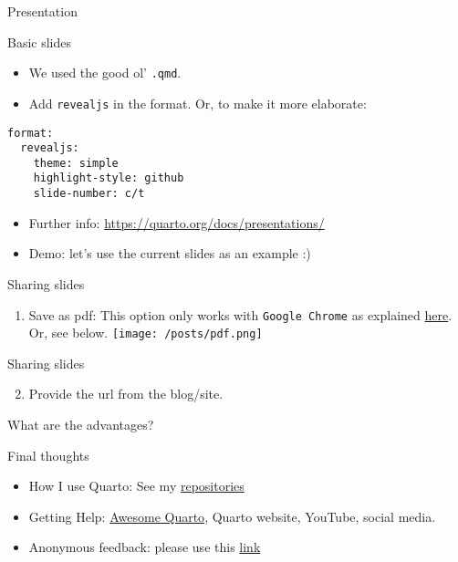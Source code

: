 \documentclass[
  ignorenonframetext,
  aspectratio=169,
]{beamer}
\providecommand{\tightlist}{%
  \setlength{\itemsep}{0pt}\setlength{\parskip}{0pt}}\usepackage{longtable,booktabs,array}
\begin{document}
\begin{frame}[fragile]{Presentation}
\label{presentation}
\begin{block}{Basic slides}
\label{basic-slides}
\begin{itemize}
\tightlist
\item
  We used the good ol' \texttt{.qmd}.
\item
  Add \texttt{revealjs} in the format. Or, to make it more elaborate:
\end{itemize}

\begin{verbatim}
format: 
  revealjs:
    theme: simple
    highlight-style: github
    slide-number: c/t
\end{verbatim}

\begin{itemize}
\item
  Further info: \url{https://quarto.org/docs/presentations/}
\item
  Demo: let's use the current slides as an example :)
\end{itemize}
\end{block}

\begin{block}{Sharing slides}
\label{sharing-slides}
\begin{enumerate}
\tightlist
\item
  Save as pdf: This option only works with \texttt{Google\ Chrome} as
  explained
  \href{https://quarto.org/docs/presentations/revealjs/presenting.html\#print-to-pdf}{here}.
  Or, see below. \texttt{[image: /posts/pdf.png]}
\end{enumerate}
\end{block}

\begin{block}{Sharing slides}
\label{sharing-slides-1}
\begin{enumerate}
\setcounter{enumi}{1}
\tightlist
\item
  Provide the url from the blog/site.
\end{enumerate}

What are the advantages?
\end{block}

\begin{block}{Final thoughts}
\label{final-thoughts}
\begin{itemize}
\item
  How I use Quarto: See my
  \href{https://github.com/usman-afzali?tab=repositories}{repositories}
\item
  Getting Help:
  \href{https://github.com/mcanouil/awesome-quarto}{Awesome Quarto},
  Quarto website, YouTube, social media.
\item
  Anonymous feedback: please use this
  \href{https://forms.gle/w4dp1UgRGZ3Vbgqf8}{link}
\end{itemize}
\end{block}


\end{frame}
\end{document}
